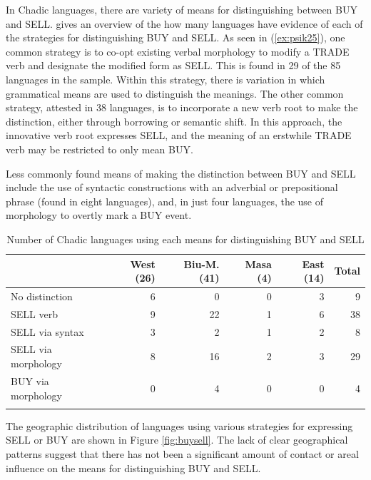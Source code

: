 In Chadic languages, there are variety of means for distinguishing between BUY and SELL.  gives an overview of the how many languages have evidence of each of the strategies for distinguishing BUY and SELL. As seen in (\ref{ex:psik25}), one common strategy is to co-opt existing verbal morphology to modify a TRADE verb and designate the modified form as SELL. This is found in 29 of the 85 languages in the sample. Within this strategy, there is variation in which grammatical means are used to distinguish the meanings. The other common strategy, attested in 38 languages, is to incorporate a new verb root to make the distinction, either through borrowing or semantic shift. In this approach, the innovative verb root expresses SELL, and the meaning of an erstwhile TRADE verb may be restricted to only mean BUY.

Less commonly found means of making the distinction between BUY and SELL include the use of syntactic constructions with an adverbial or prepositional phrase (found in eight languages), and, in just four languages, the use of morphology to overtly mark a BUY event.

\begin{table}[H]
	\caption{Number of Chadic languages using each means for distinguishing BUY and SELL}
	\label{tab:BUYSELL}
	\begin{tabular}{l@{}rrrrr} %
		\lsptoprule
	{}	      &  West (26) &  Biu-M. (41) &  Masa (4) &  East (14) &  Total \\
	\midrule
No distinction       &     6 &            0 &     0 &     3 &      9 \\
SELL verb            &     9 &           22 &     1 &     6 &     38 \\
SELL via syntax     &     3 &            2 &     1 &     2 &      8 \\
SELL via morphology &     8 &           16 &     2 &     3 &     29 \\
BUY via morphology  &     0 &            4 &     0 &     0 &      4 \\
		\lspbottomrule
	\end{tabular}
\end{table}

The geographic distribution of languages using various strategies for expressing SELL or BUY are shown in Figure \ref{fig:buysell}. The lack of clear geographical patterns suggest that there has not been a significant amount of contact or areal influence on the means for distinguishing BUY and SELL.


